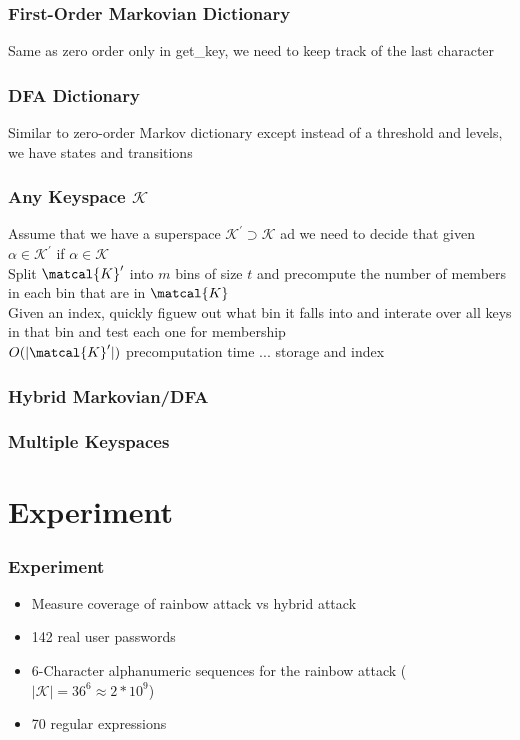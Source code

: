\documentclass{beamer}
\begin{document}
\begin{frame}
\frametitle{First-Order Markovian Dictionary}
Same as zero order only in get\_key, we need to keep track of the last character
\end{frame}

\begin{frame}
\frametitle{DFA Dictionary}
Similar to zero-order Markov dictionary except instead of a threshold and levels, we have states and transitions
\end{frame}

\begin{frame}
\frametitle{Any Keyspace $\mathcal{K}$}
Assume that we have a superspace $\mathcal{K}^\prime \supset \mathcal{K}$ ad we need to decide that given $\alpha \in \mathcal{K}^\prime$ if $\alpha \in \mathcal{K}$ \\
Split $\matcal{K}^\prime$ into $m$ bins of size $t$ and precompute the number of members in each bin that are in $\matcal{K}$ \\
Given an index, quickly figuew out what bin it falls into and interate over all keys in that bin and test each one for membership \\
$O(\lvert \matcal{K}^\prime \rvert)$ precomputation time 
... storage and index
\end{frame}

\begin{frame}
\frametitle{Hybrid Markovian/DFA}
\end{frame}

\begin{frame}
\frametitle{Multiple Keyspaces}
\end{frame}


\section{Experiment} 
\begin{frame}
\frametitle{Experiment}
\begin{itemize}
\item Measure coverage of rainbow attack vs hybrid attack
\item 142 real user passwords
\item 6-Character alphanumeric sequences for the rainbow attack ($|\mathcal{K}| = 36^6 \approx 2*10^9 $)
\item 70 regular expressions
\end{itemize}
\end{frame}
\end{document}
